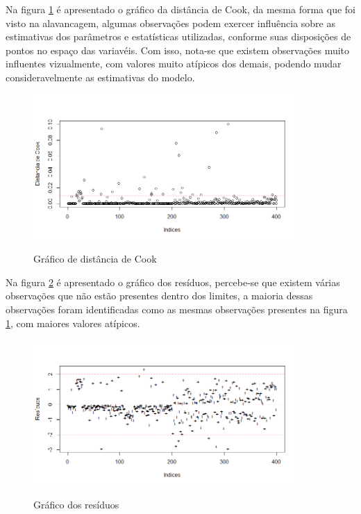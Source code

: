 \documentclass[a4paper]{article}
\begin{document}
Na figura \ref{fig:cook1} é apresentado o gráfico da distância de Cook, da mesma forma que foi visto na alavancagem, algumas observações podem exercer influência sobre as estimativas dos parâmetros e estatísticas utilizadas, conforme suas disposições de pontos no espaço das variavéis. Com isso, nota-se que existem observações muito influentes vizualmente, com valores muito atípicos dos demais, podendo mudar consideravelmente as estimativas do modelo.

\begin{figure}[H] 
    \centering %
    \caption{Gráfico de distância de Cook}
    \includegraphics[width=0.9\textwidth]{imagens/Cook1.png}
    \label{fig:cook1}
\end{figure}

Na figura \ref{fig:res1} é apresentado o gráfico dos resíduos, percebe-se que existem várias observações que não estão presentes dentro dos limites, a maioria dessas observações foram identificadas como as mesmas observações presentes na figura \ref{fig:cook1}, com maiores valores atípicos.

\begin{figure}[H] 
    \centering %
    \caption{Gráfico dos resíduos}
    \includegraphics[width=0.9\textwidth]{imagens/Res1.png}
    \label{fig:res1}
\end{figure}
\end{document}
